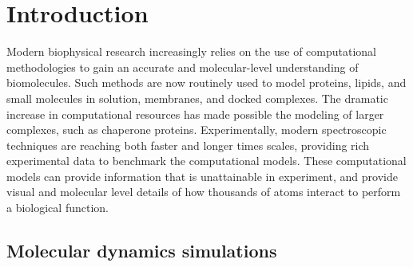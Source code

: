 \chapter{Introduction} \label{intro}


Modern biophysical research increasingly relies on the use of computational methodologies to gain an accurate and molecular-level understanding of biomolecules. 
Such methods are now routinely used to model proteins, lipids, and small molecules in solution, membranes, and docked complexes. 
The dramatic increase in computational resources has made possible the modeling of larger complexes, such as chaperone proteins. 
Experimentally, modern spectroscopic techniques are reaching both faster and longer times scales, providing rich experimental data to benchmark the computational models. 
These computational models can provide information that is unattainable in experiment, and provide visual and molecular level details of how thousands of atoms interact to perform a biological function. 

\section{Molecular dynamics simulations}

